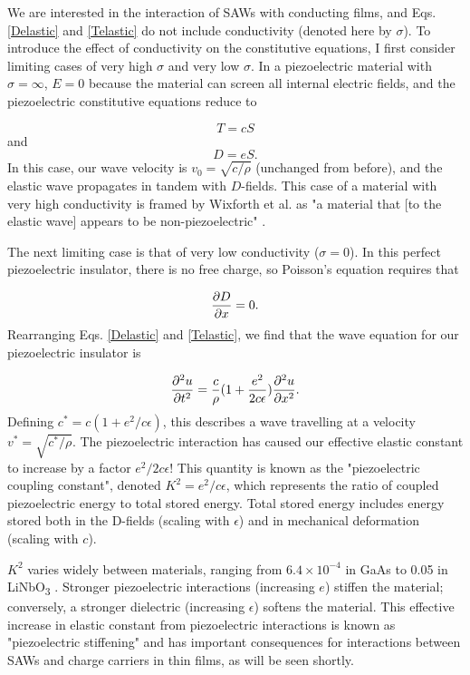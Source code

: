 \documentclass[double,12pt,1in,seploa]{beavtex}
\begin{document}
We are interested in the interaction of SAWs with conducting films, and Eqs. \ref{Delastic} and \ref{Telastic} do not include conductivity (denoted here by $\sigma$). To introduce the effect of conductivity on the constitutive equations, I first consider limiting cases of very high $\sigma$ and very low $\sigma$. In a piezoelectric material with $\sigma = \infty$, $E = 0$ because the material can screen all internal electric fields, and the piezoelectric constitutive equations reduce to 

\begin{equation}
    T = cS
\end{equation}
and
\begin{equation}
    D = eS.
\end{equation}
In this case, our wave velocity is $v_0 = \sqrt{c/\rho}$ (unchanged from before), and the elastic wave propagates in tandem with $D$-fields. This case of a material with very high conductivity is framed by Wixforth et al.  as "a material that [to the elastic wave] appears to be non-piezoelectric" \cite{wixforth_surface_1989}.

The next limiting case is that of very low conductivity ($\sigma = 0$). In this perfect piezoelectric insulator, there is no free charge, so Poisson's equation requires that 

\begin{equation}
    \pdv{D}{x} = 0.
\end{equation}
Rearranging Eqs. \ref{Delastic} and \ref{Telastic}, we find that the wave equation for our piezoelectric insulator is

\begin{equation}
    \pdv[2]{u}{t} = \frac{c}{\rho} (1 + \frac{e^2}{2c\epsilon}) \pdv[2]{u}{x}. \label{wave eqn for insulator}
\end{equation}
Defining $c^* = c(1 + e^2/c\epsilon)$, this describes a wave travelling at a velocity $v^* =\sqrt{c^*/\rho}$. The piezoelectric interaction has caused our effective elastic constant to increase by a factor $e^2/2c\epsilon$! This quantity is known as the "piezoelectric coupling constant", denoted $K^2 = e^2/c\epsilon$, which represents the ratio of coupled piezoelectric energy to total stored energy. Total stored energy includes energy stored both in the D-fields (scaling with $\epsilon$) and in mechanical deformation (scaling with $c$). 

$K^2$ varies widely between materials, ranging from $6.4 \times 10^{-4}$ in GaAs \cite{wixforth_surface_1989} to 0.05 in LiNbO\textsubscript{3} \cite{warner_determination_1967}. Stronger piezoelectric interactions (increasing $e$) stiffen the material; conversely, a stronger dielectric (increasing $\epsilon$) softens the material. This effective increase in elastic constant from piezoelectric interactions is known as "piezoelectric stiffening" and has important consequences for interactions between SAWs and charge carriers in thin films, as will be seen shortly. 
\end{document}

